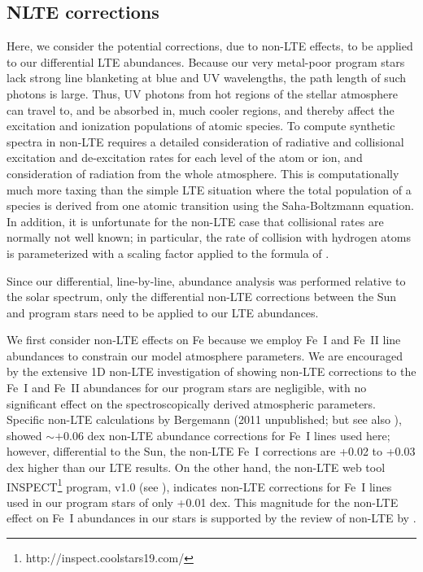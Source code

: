 \documentclass[revtex4]{emulateapj}
\begin{document}
\subsection{NLTE corrections} \label{sec:NLTE}
Here, we consider the potential corrections, due to non-LTE effects, to be applied to our differential LTE abundances.  Because our very metal-poor program stars lack strong line blanketing at blue and UV wavelengths, the path length of such photons is large.  Thus, UV photons from hot regions of the stellar atmosphere can travel to, and be absorbed in, much cooler regions, and thereby affect the excitation and ionization populations of atomic species.  To compute synthetic spectra in non-LTE requires a detailed consideration of radiative and collisional excitation and de-excitation rates for each level of the atom or ion, and consideration of radiation from the whole atmosphere.  This is computationally much more taxing than the simple LTE  situation where the total population of a species is derived from one atomic transition using the Saha-Boltzmann equation.  In addition, it is unfortunate for the non-LTE case that collisional rates are normally not well known; in particular, the rate of collision with hydrogen atoms is parameterized with a scaling factor applied to the formula of \citet{Drawin1968,Drawin1969}.

Since our differential, line-by-line, abundance analysis was performed relative to the solar spectrum, only the differential non-LTE corrections between the Sun and program stars need to be applied to our LTE abundances.

We first consider non-LTE effects on Fe because we employ Fe~I and Fe~II line abundances to constrain our model atmosphere parameters. We are encouraged by the extensive 1D non-LTE investigation of \citet{Lind2012} showing non-LTE corrections to the Fe~I and Fe~II abundances for our program stars are negligible, with no significant effect on the spectroscopically derived atmospheric parameters.  Specific non-LTE calculations by Bergemann (2011 unpublished; but see also \citealt{BN2014}), showed $\sim$$+$0.06 dex non-LTE abundance corrections for Fe~I lines used here; however, differential to the Sun, the non-LTE Fe~I corrections are +0.02 to +0.03 dex higher than our LTE results.  On the other hand, the non-LTE web tool INSPECT\footnote{http://inspect.coolstars19.com/} program, v1.0 (see \citet{Lind2012}), indicates non-LTE corrections for Fe~I lines used in our program stars of only +0.01 dex.  This magnitude for the non-LTE effect on Fe~I abundances in our stars is supported by the review of non-LTE by \citet{Mash2014}.
\end{document}
